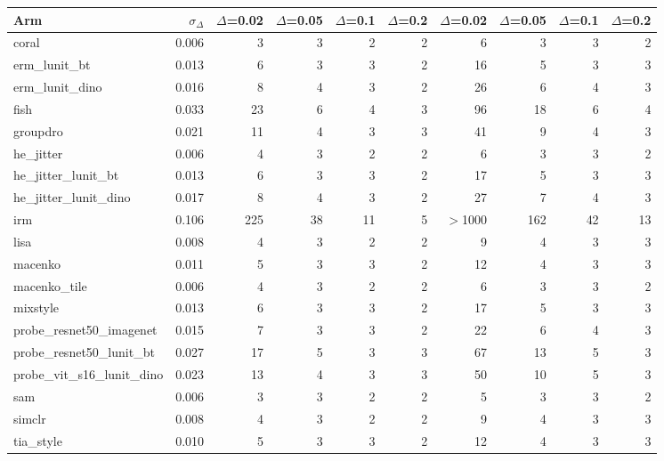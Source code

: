 \begin{tabular}{lrrrrrrrrr}
\toprule
Arm & $\sigma_\Delta$ & $\Delta$=0.02 & $\Delta$=0.05 & $\Delta$=0.1 & $\Delta$=0.2 & $\Delta$=0.02 & $\Delta$=0.05 & $\Delta$=0.1 & $\Delta$=0.2 \\
\midrule
coral & 0.006 & 3 & 3 & 2 & 2 & 6 & 3 & 3 & 2 \\
erm\_lunit\_bt & 0.013 & 6 & 3 & 3 & 2 & 16 & 5 & 3 & 3 \\
erm\_lunit\_dino & 0.016 & 8 & 4 & 3 & 2 & 26 & 6 & 4 & 3 \\
fish & 0.033 & 23 & 6 & 4 & 3 & 96 & 18 & 6 & 4 \\
groupdro & 0.021 & 11 & 4 & 3 & 3 & 41 & 9 & 4 & 3 \\
he\_jitter & 0.006 & 4 & 3 & 2 & 2 & 6 & 3 & 3 & 2 \\
he\_jitter\_lunit\_bt & 0.013 & 6 & 3 & 3 & 2 & 17 & 5 & 3 & 3 \\
he\_jitter\_lunit\_dino & 0.017 & 8 & 4 & 3 & 2 & 27 & 7 & 4 & 3 \\
irm & 0.106 & 225 & 38 & 11 & 5 & $>$1000 & 162 & 42 & 13 \\
lisa & 0.008 & 4 & 3 & 2 & 2 & 9 & 4 & 3 & 3 \\
macenko & 0.011 & 5 & 3 & 3 & 2 & 12 & 4 & 3 & 3 \\
macenko\_tile & 0.006 & 4 & 3 & 2 & 2 & 6 & 3 & 3 & 2 \\
mixstyle & 0.013 & 6 & 3 & 3 & 2 & 17 & 5 & 3 & 3 \\
probe\_resnet50\_imagenet & 0.015 & 7 & 3 & 3 & 2 & 22 & 6 & 4 & 3 \\
probe\_resnet50\_lunit\_bt & 0.027 & 17 & 5 & 3 & 3 & 67 & 13 & 5 & 3 \\
probe\_vit\_s16\_lunit\_dino & 0.023 & 13 & 4 & 3 & 3 & 50 & 10 & 5 & 3 \\
sam & 0.006 & 3 & 3 & 2 & 2 & 5 & 3 & 3 & 2 \\
simclr & 0.008 & 4 & 3 & 2 & 2 & 9 & 4 & 3 & 3 \\
tia\_style & 0.010 & 5 & 3 & 3 & 2 & 12 & 4 & 3 & 3 \\
\bottomrule
\end{tabular}
